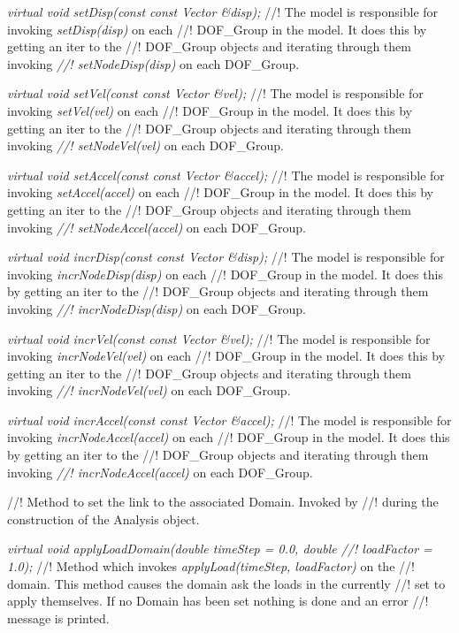 {\em virtual void setDisp(const const Vector \&disp);}
//! The model is responsible for invoking {\em setDisp(disp)} on each
//! DOF\_Group in the model. It does this by getting an iter to the
//! DOF\_Group objects and iterating through them invoking {\em
//! setNodeDisp(disp)} on each DOF\_Group.

{\em virtual void setVel(const const Vector \&vel);}
//! The model is responsible for invoking {\em setVel(vel)} on each
//! DOF\_Group in the model. It does this by getting an iter to the
//! DOF\_Group objects and iterating through them invoking {\em
//! setNodeVel(vel)} on each DOF\_Group.


{\em virtual void setAccel(const const Vector \&accel);}
//! The model is responsible for invoking {\em setAccel(accel)} on each
//! DOF\_Group in the model. It does this by getting an iter to the
//! DOF\_Group objects and iterating through them invoking {\em
//! setNodeAccel(accel)} on each DOF\_Group.

{\em virtual void incrDisp(const const Vector \&disp);}
//! The model is responsible for invoking {\em incrNodeDisp(disp)} on each
//! DOF\_Group in the model. It does this by getting an iter to the
//! DOF\_Group objects and iterating through them invoking {\em
//! incrNodeDisp(disp)} on each DOF\_Group.


{\em virtual void incrVel(const const Vector \&vel);}
//! The model is responsible for invoking {\em incrNodeVel(vel)} on each
//! DOF\_Group in the model. It does this by getting an iter to the
//! DOF\_Group objects and iterating through them invoking {\em
//! incrNodeVel(vel)} on each DOF\_Group.


{\em virtual void incrAccel(const const Vector \&accel);}
//! The model is responsible for invoking {\em incrNodeAccel(accel)} on each
//! DOF\_Group in the model. It does this by getting an iter to the
//! DOF\_Group objects and iterating through them invoking {\em
//! incrNodeAccel(accel)} on each DOF\_Group.



//! Method to set the link to the associated Domain. Invoked by
//! during the construction of the \p Analysis object.

{\em virtual void applyLoadDomain(double timeStep = 0.0, double
//! loadFactor = 1.0);}
//! Method which invokes {\em applyLoad(timeStep, loadFactor)} on the
//! domain. This method causes the domain ask the loads in the currently
//! set to apply themselves. If no Domain has been set nothing is done and an error
//! message is printed. 



